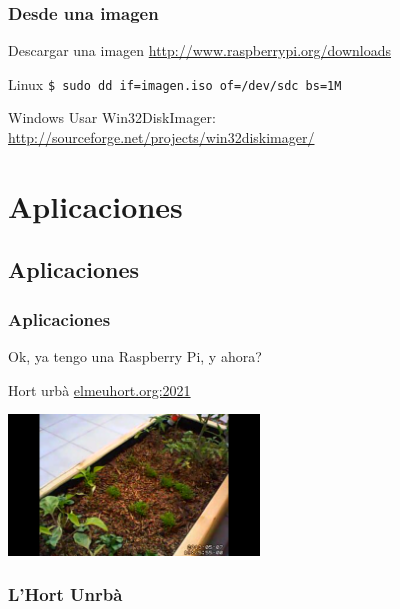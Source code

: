\documentclass[10pt,colorlinks]{beamer}
\begin{document}
\begin{frame}[fragile]\frametitle{Desde una imagen}
\begin{block}{Descargar una imagen}
\href{http://www.raspberrypi.org/downloads}{http://www.raspberrypi.org/downloads}
\end{block}

\begin{block}{Linux}
\verb|$ sudo dd if=imagen.iso of=/dev/sdc bs=1M|
\end{block}
\begin{block}{Windows}
Usar Win32DiskImager:\\
\href{http://sourceforge.net/projects/win32diskimager/}{http://sourceforge.net/projects/win32diskimager/}
\end{block}

\end{frame}


\section{Aplicaciones}

\subsection{Aplicaciones}
\begin{frame}[fragile]\frametitle{Aplicaciones}

Ok, ya tengo una Raspberry Pi, y ahora? 
\begin{block}{Hort urbà}
\href{elmeuhort.org:2021}{elmeuhort.org:2021}

\end{block}
\begin{block}{}
\includegraphics[width=0.5\textwidth]{figs/hort}
\end{block}
\end{frame}

\begin{frame}[fragile]\frametitle{L'Hort Unrbà}


\end{frame}
\end{document}
